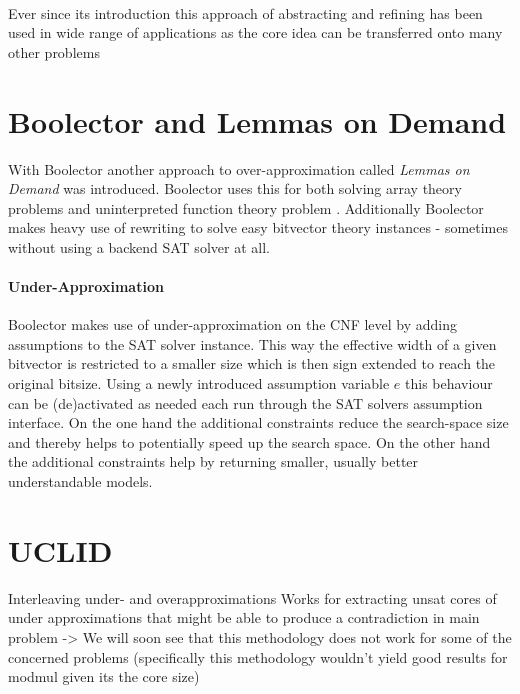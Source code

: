 \paragraph{}
Ever since its introduction this approach of abstracting and refining has been used in wide range of applications as the core idea can be transferred onto many other problems



\section{Boolector and Lemmas on Demand}
With Boolector \cite{Brummayer-Biere2009_Chapter_BoolectorAnEfficientSMTSolverF} another approach to over-approximation called \textit{Lemmas on Demand} was introduced. Boolector uses this for both solving array theory problems \cite{p6-brummayer} and uninterpreted function theory problem \cite{NiemetzPreinerBiere-FMCAD14}. Additionally Boolector makes heavy use of rewriting to solve easy bitvector theory instances - sometimes without using a backend SAT solver at all.

\paragraph{Under-Approximation}
Boolector makes use of under-approximation on the CNF level by adding assumptions to the SAT solver instance\cite{Brummayer-PhD}. This way the effective width of a given bitvector is restricted to a smaller size which is then sign extended to reach the original bitsize. Using a newly introduced assumption variable $e$ this behaviour can be (de)activated as needed each run through the SAT solvers assumption interface. On the one hand the additional constraints reduce the search-space size and thereby helps to potentially speed up the search space. On the other hand the additional constraints help by returning smaller, usually better understandable models.


\section{UCLID}
Interleaving under- and overapproximations
Works for extracting unsat cores of under approximations that might be able to produce a contradiction in main problem
-> We will soon see that this methodology does not work for some of the concerned problems (specifically this methodology wouldn't yield good results for modmul given its the core size)
